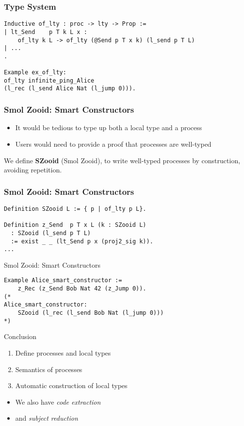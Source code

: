 \begin{frame}[fragile]
    \frametitle{Type System}
    \begin{verbatim}
Inductive of_lty : proc -> lty -> Prop :=
| lt_Send    p T k L x :
    of_lty k L -> of_lty (@Send p T x k) (l_send p T L)
| ...
.

Example ex_of_lty:
of_lty infinite_ping_Alice
(l_rec (l_send Alice Nat (l_jump 0))).
    \end{verbatim}
\end{frame}

\begin{frame}[fragile]
    \frametitle{Smol Zooid: Smart Constructors}
    \begin{sticky}
\vspace{-.5cm}
    \begin{itemize}
        \item It would be tedious to type up both a local type and a process
        \item Users would need to provide a proof that processes are well-typed
    \end{itemize}
    \end{sticky}
    \begin{greenbox}{}
        We define \textbf{SZooid} (Smol Zooid), to write
well-typed processes by construction, avoiding repetition.
    \end{greenbox}
\end{frame}

\begin{frame}[fragile]
    \frametitle{Smol Zooid: Smart Constructors}
\begin{verbatim}
Definition SZooid L := { p | of_lty p L}.

Definition z_Send  p T x L (k : SZooid L)
  : SZooid (l_send p T L)
  := exist _ _ (lt_Send p x (proj2_sig k)).
...
\end{verbatim}
\end{frame}

\begin{frame}[fragile]{Smol Zooid: Smart Constructors}
\begin{verbatim}
Example Alice_smart_constructor :=
	z_Rec (z_Send Bob Nat 42 (z_Jump 0)).
(*
Alice_smart_constructor:
	SZooid (l_rec (l_send Bob Nat (l_jump 0)))
*)
\end{verbatim}
\end{frame}


\begin{frame}{Conclusion}
	\begin{enumerate}
		\item Define processes and local types
		\item Semantics of processes
		\item Automatic construction of local types
	\end{enumerate}
	\begin{itemize}
		\item We also have {\it code extraction}
		\item and {\it subject reduction}
	\end{itemize}
\end{frame}



